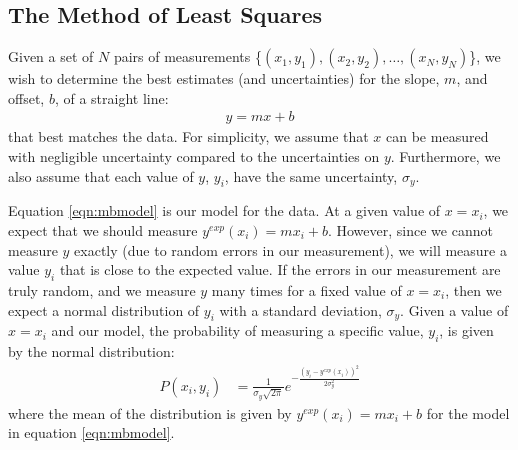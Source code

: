 
\subsection{The Method of Least Squares}
Given a set of $N$ pairs of measurements \{$(x_1,y_1), (x_2,y_2), \dots, (x_N,y_N)$\}, we wish to determine the best estimates (and uncertainties) for the slope, $m$, and offset, $b$, of a straight line:
\begin{align}
\label{eqn:mbmodel}
y=mx+b
\end{align}
that best matches the data. For simplicity, we assume that $x$ can be measured with negligible uncertainty compared to the uncertainties on $y$. Furthermore, we also assume that each value of $y$, $y_i$, have the same uncertainty, $\sigma_{y}$.

Equation \ref{eqn:mbmodel} is our model for the data. At a given value of $x=x_i$, we expect that we should measure $y^{exp}(x_i)=mx_i+b$. However, since we cannot measure $y$ exactly (due to random errors in our measurement), we will measure a value $y_i$ that is close to the expected value. If the errors in our measurement are truly random, and we measure $y$ many times for a fixed value of $x=x_i$, then we expect a normal distribution of $y_i$ with a standard deviation, $\sigma_{y}$. Given a value of $x=x_i$ and our model, the probability of measuring a specific value, $y_i$, is given by the normal distribution:
\begin{align}
P(x_i,y_i)&=\frac{1}{\sigma_{y}\sqrt{2\pi}}e^{-\frac{(y_i-y^{exp}(x_i))^2}{2\sigma_{y}^2}}
\end{align}
where the mean of the distribution is given by $y^{exp}(x_i)=mx_i+b$ for the model in equation \ref{eqn:mbmodel}.

